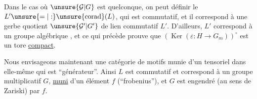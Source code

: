 
Dans le cas où $\unsure{\mathcal G|G}$ est quelconque, on peut définir  le  $L'\unsure{=|:}\unsure{\operatorname{corad}}(L)$, qui est commutatif, et il correspond à une gerbe quotient $\unsure{\mathcal G'|G'}$ de lien commutatif $L'$. D'ailleurs, $L'$ correspond à un groupe algébrique , et ce qui précède prouve que $(\operatorname{Ker}(\varepsilon:H\longrightarrow G_m))^\circ$ est un tore \uline{compact}.


Nous envisageons maintenant une  catégorie de motifs munie d'un   tensoriel dans elle-même qui est ``générateur''. Ainsi $L$ est commutatif et correspond à un groupe    multiplicatif $G$, \uline{muni} d'un élément $f$ (``frobenius''), et $G$ est engendré (au sens de Zariski) par $f$.  


